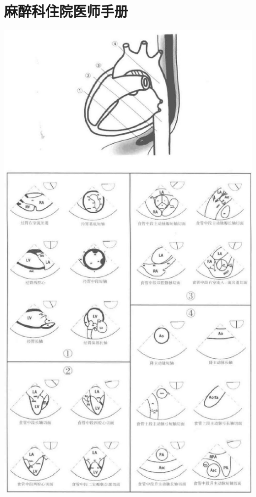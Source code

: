 \documentclass[10pt]{article}
\begin{document}
\section*{麻醉科住院医师手册}
\begin{center}
\includegraphics[max width=\textwidth]{2024_07_05_645bb794a4d4f32ee0c8g-106}
\end{center}
\end{document}
